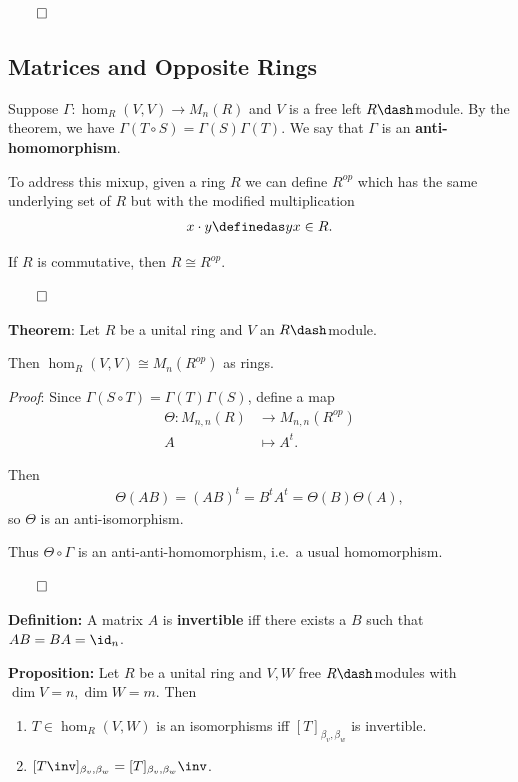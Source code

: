 \(\qed\)

\hypertarget{matrices-and-opposite-rings}{%
\subsection{Matrices and Opposite
Rings}\label{matrices-and-opposite-rings}}

Suppose \(\Gamma: \hom_R(V, V) \to M_n(R)\) and \(V\) is a free left
\(R\dash\)module. By the theorem, we have
\(\Gamma(T \circ S) = \Gamma(S) \Gamma(T)\). We say that \(\Gamma\) is
an \textbf{anti-homomorphism}.

To address this mixup, given a ring \(R\) we can define \(R^{op}\) which
has the same underlying set of \(R\) but with the modified
multiplication
\begin{align*}
x \cdot y \definedas yx \in R
.\end{align*}

If \(R\) is commutative, then \(R \cong R^{op}\).

\(\qed\)

\textbf{Theorem}: Let \(R\) be a unital ring and \(V\) an
\(R\dash\)module.

Then \(\hom_R(V, V) \cong M_n(R^{op})\) as rings.

\emph{Proof}: Since \(\Gamma(S \circ T) = \Gamma(T) \Gamma(S)\), define
a map \begin{align*}
\Theta: M_{n, n}(R) &\to M_{n, n}(R^{op}) \\
A &\mapsto A^t
.\end{align*}

Then
\begin{align*}
\Theta(AB) = (AB)^t = B^t A^t = \Theta(B) \Theta(A)
,\end{align*} so \(\Theta\) is an anti-isomorphism.

Thus \(\Theta\circ \Gamma\) is an anti-anti-homomorphism, i.e.~a usual
homomorphism.

\(\qed\)

\textbf{Definition:} A matrix \(A\) is \textbf{invertible} iff there
exists a \(B\) such that \(AB = BA = \id_n\).

\textbf{Proposition:} Let \(R\) be a unital ring and \(V, W\) free
\(R\dash\)modules with \(\dim V = n, \dim W = m\). Then

\begin{enumerate}
\def\labelenumi{\arabic{enumi}.}
\item
  \(T \in \hom_R(V, W)\) is an isomorphisms iff
  \([T]_{\beta_v, \beta_w}\) is invertible.
\item
  \([T\inv]_{\beta_v, \beta_w} = [T]_{\beta_v, \beta_w}\inv\).
\end{enumerate}

